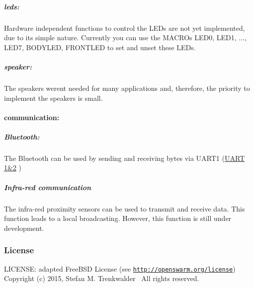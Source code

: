 \hypertarget{group__epuck_epuck_led}{}\subparagraph{leds\+:}\label{group__epuck_epuck_led}
Hardware independent functions to control the L\+E\+Ds are not yet implemented, due to it\textquotesingle{}s simple nature. Currently you can use the M\+A\+C\+R\+Os L\+E\+D0, L\+E\+D1, ..., L\+E\+D7, B\+O\+D\+Y\+L\+E\+D, F\+R\+O\+N\+T\+L\+E\+D to set and unset these L\+E\+Ds. \hypertarget{group__epuck_epuck_speaker}{}\subparagraph{speaker\+:}\label{group__epuck_epuck_speaker}
The speakers weren\textquotesingle{}t needed for many applications and, therefore, the priority to implement the speakers is small. \hypertarget{group__epuck_epuck_com}{}\paragraph{communication\+:}\label{group__epuck_epuck_com}
\hypertarget{group__epuck_epuck_bluetooth}{}\subparagraph{Bluetooth\+:}\label{group__epuck_epuck_bluetooth}
The Bluetooth can be used by sending and receiving bytes via U\+A\+R\+T1 (\hyperlink{group__uart}{U\+A\+R\+T 1\&2} ) \hypertarget{group__epuck_epuck_ircom}{}\subparagraph{Infra-\/red communication}\label{group__epuck_epuck_ircom}
The infra-\/red proximity sensors can be used to transmit and receive data. This function leads to a local broadcasting. However, this function is still under development.\hypertarget{group__epuck_epuck_license}{}\subsubsection{License}\label{group__epuck_epuck_license}
L\+I\+C\+E\+N\+S\+E\+: adapted Free\+B\+S\+D License (see \href{http://openswarm.org/license}{\tt http\+://openswarm.\+org/license})~\newline
Copyright (c) 2015, Stefan M. Trenkwalder~\newline
All rights reserved. 